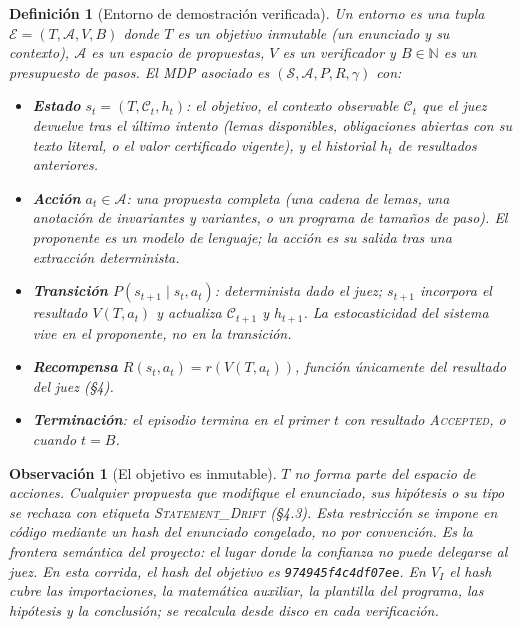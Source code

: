 \documentclass[11pt,a4paper]{article}
\newtheorem{definition}{Definición}
\newtheorem{remark}{Observación}
\begin{document}
\begin{definition}[Entorno de demostración verificada]
Un entorno es una tupla $\mathcal{E} = (T, \mathcal{A}, V, B)$ donde $T$ es un \emph{objetivo} inmutable (un enunciado y su contexto), $\mathcal{A}$ es un espacio de \emph{propuestas}, $V$ es un \emph{verificador} y $B \in \mathbb{N}$ es un presupuesto de pasos. El MDP asociado es $(\mathcal{S}, \mathcal{A}, P, R, \gamma)$ con:
\begin{itemize}
  \item \textbf{Estado} $s_t = (T, \mathcal{C}_t, h_t)$: el objetivo, el \emph{contexto observable} $\mathcal{C}_t$ que el juez devuelve tras el último intento (lemas disponibles, obligaciones abiertas con su texto literal, o el valor certificado vigente), y el historial $h_t$ de resultados anteriores.
  \item \textbf{Acción} $a_t \in \mathcal{A}$: una propuesta completa (una cadena de lemas, una anotación de invariantes y variantes, o un programa de tamaños de paso). El proponente es un modelo de lenguaje; la acción es su salida tras una extracción determinista.
  \item \textbf{Transición} $P(s_{t+1} \mid s_t, a_t)$: determinista dado el juez; $s_{t+1}$ incorpora el resultado $V(T, a_t)$ y actualiza $\mathcal{C}_{t+1}$ y $h_{t+1}$. La estocasticidad del sistema vive en el proponente, no en la transición.
  \item \textbf{Recompensa} $R(s_t, a_t) = r(V(T, a_t))$, función únicamente del resultado del juez (§4).
  \item \textbf{Terminación}: el episodio termina en el primer $t$ con resultado \textsc{Accepted}, o cuando $t = B$.
\end{itemize}
\end{definition}

\begin{remark}[El objetivo es inmutable]
$T$ no forma parte del espacio de acciones. Cualquier propuesta que modifique el enunciado, sus hipótesis o su tipo se rechaza con etiqueta \textsc{Statement\_Drift} (§4.3). Esta restricción se impone en código mediante un hash del enunciado congelado, no por convención. Es la \emph{frontera semántica} del proyecto: el lugar donde la confianza no puede delegarse al juez.
En esta corrida, el hash del objetivo es \texttt{974945f4c4df07ee}. En $V_I$ el hash cubre las importaciones, la matemática auxiliar, la plantilla del programa, las hipótesis y la conclusión; se recalcula desde disco en cada verificación.
\end{remark}
\end{document}

